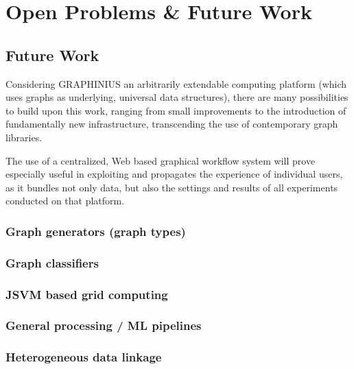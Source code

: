 \chapter{Open Problems \& Future Work}
\label{ch:future_work}



\section{Future Work}
\label{sect:future_challenges}

Considering GRAPHINIUS an arbitrarily extendable computing platform (which uses graphs as underlying, universal data structures), there are many possibilities to build upon this work, ranging from small improvements to the introduction of fundamentally new infrastructure, transcending the use of contemporary graph libraries. 

The use of a centralized, Web based graphical workflow system will prove especially useful in exploiting and propagates the experience of individual users, as it bundles not only data, but also the settings and results of all experiments conducted on that platform.


\subsection{Graph generators (graph types)}
\label{ssect:graph_gen}


\subsection{Graph classifiers}
\label{ssect:graph_class}


\subsection{JSVM based grid computing}
\label{ssect:jsvm_grid}


\subsection{General processing / ML pipelines}
\label{ssect:pipelines}


\subsection{Heterogeneous data linkage}
\label{ssect:heterogeneous_data}

